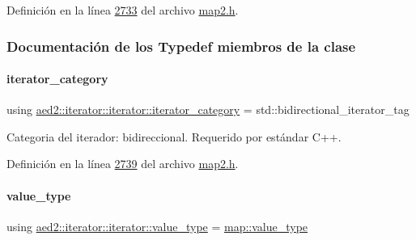Definición en la línea \hyperlink{map2_8h_source_l02733}{2733} del archivo \hyperlink{map2_8h_source}{map2.\+h}.



\subsubsection{Documentación de los \textquotesingle{}Typedef\textquotesingle{} miembros de la clase}
\mbox{\label{classaed2_1_1iterator_1_1iterator_ad98a0b33afe1df977c248314251fe2b2_ad98a0b33afe1df977c248314251fe2b2}} 
\paragraph{\texorpdfstring{iterator\+\_\+category}{iterator\_category}}
{\footnotesize\ttfamily using \hyperlink{classaed2_1_1iterator_1_1iterator_ad98a0b33afe1df977c248314251fe2b2_ad98a0b33afe1df977c248314251fe2b2}{aed2\+::iterator\+::iterator\+::iterator\+\_\+category} =  std\+::bidirectional\+\_\+iterator\+\_\+tag}



Categoria del iterador\+: bidireccional. Requerido por estándar C++. 



Definición en la línea \hyperlink{map2_8h_source_l02739}{2739} del archivo \hyperlink{map2_8h_source}{map2.\+h}.

\mbox{\label{classaed2_1_1iterator_1_1iterator_a10ed10b6d144d04ae127ef846e1d4e7c_a10ed10b6d144d04ae127ef846e1d4e7c}} 
\paragraph{\texorpdfstring{value\+\_\+type}{value\_type}}
{\footnotesize\ttfamily using \hyperlink{classaed2_1_1iterator_1_1iterator_a10ed10b6d144d04ae127ef846e1d4e7c_a10ed10b6d144d04ae127ef846e1d4e7c}{aed2\+::iterator\+::iterator\+::value\+\_\+type} =  \hyperlink{classaed2_1_1map_a719db98e0ff9a837610f76be33264680_a719db98e0ff9a837610f76be33264680}{map\+::value\+\_\+type}}



